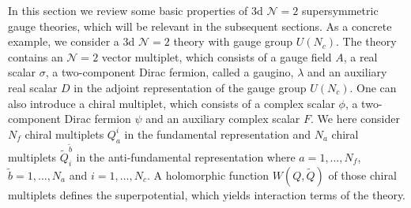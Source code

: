 \documentclass[a4paper,11pt]{article}
\begin{document}
In this section we review some basic properties of 3d $\mathcal N = 2$ supersymmetric gauge theories, which will be relevant in the subsequent sections. As a concrete example, we consider a 3d $\mathcal N = 2$ theory with gauge group $U(N_c)$. The theory contains an $\mathcal N = 2$ vector multiplet, which consists of a gauge field $A$, a real scalar $\sigma$, a two-component Dirac fermion, called a gaugino, $\lambda$ and an auxiliary real scalar $D$ in the adjoint representation of the gauge group $U(N_c)$. One can also introduce a chiral multiplet, which consists of a complex scalar $\phi$, a two-component Dirac fermion $\psi$ and an auxiliary complex scalar $F$. We here consider $N_f$ chiral multiplets $Q_a^i$ in the fundamental representation and $N_a$ chiral multiplets $\tilde Q_i^{\tilde b}$ in the anti-fundamental representation where $a = 1,\ldots,N_f$, $\tilde b = 1,\ldots,N_a$ and $i = 1,\ldots,N_c$. A holomorphic function $W(Q,\tilde Q)$ of those chiral multiplets defines the superpotential, which yields interaction terms of the theory.
\end{document}
